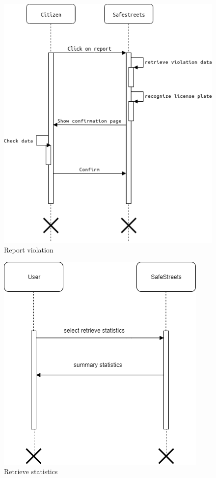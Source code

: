 \documentclass{article}
\begin{document}
\begin{figure}[h!]
    \centering
    \includegraphics[scale=0.5]{img/sequence_diagrams/report_violation.png}
    \caption{Report violation}
\end{figure}

\begin{figure}[h!]
    \centering
    \includegraphics[scale=0.5]{img/sequence_diagrams/retrieve_statistics.png}
    \caption{Retrieve statistics}
\end{figure}
\end{document}
